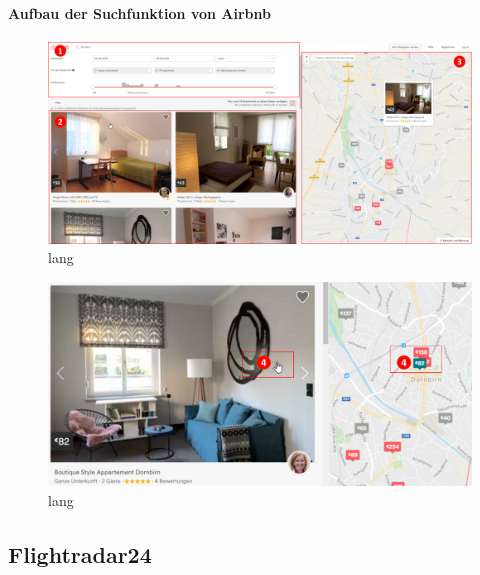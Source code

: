 \documentclass[../Bachelorarbeit.tex]{subfiles}
\begin{document}
\paragraph{Aufbau der Suchfunktion von Airbnb}

\begin{figure}[h]
\centering
\includegraphics[width=1\linewidth]{img/StandDerTechnik/airbnbOverview}
\caption[kurz]{lang}
\label{fig:airbnbOverview}
\end{figure}

\begin{figure}[h]
\centering
\includegraphics[width=1\linewidth]{img/StandDerTechnik/airbnbDetail}
\caption[kurz]{lang}
\label{fig:airbnbDetail}
\end{figure}


\subsection{Flightradar24}
\end{document}
